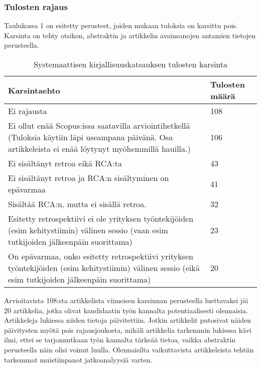 \subsubsection{Tulosten rajaus}
Taulukossa 1 on esitetty perusteet, joiden mukaan tuloksia on karsittu pois. Karsinta on tehty otsikon, abstraktin ja artikkelin avainsanojen antamien tietojen perusteella.
\begin{table}
    \begin{tabular}{|p{12cm}|p{2cm}|}
        \hline
        \textbf{Karsintaehto} & \textbf{Tulosten määrä} \\ \hline
        Ei rajausta                                                                                                                                               & 108            \\ \hline
        Ei ollut enää Scopus:issa saatavilla arviointihetkellä (Tuloksia käytiin läpi useampana päivänä. Osa artikkeleista ei enää löytynyt myöhemmillä hauilla.) & 106            \\ \hline
        Ei sisältänyt retroa eikä RCA:ta                                                                                                                          & 43             \\ \hline
        Ei sisältänyt retroa ja RCA:n sisältyminen on epävarmaa                                                                                                   & 41             \\ \hline
        Sisältää RCA:n, mutta ei sisällä retroa.                                                                                                                  & 32             \\ \hline
        Esitetty retrospektiivi ei ole yrityksen työntekijöiden (esim kehitystiimin) välinen sessio (vaan esim tutkijoiden jälkeenpäin suorittama)                & 23             \\ \hline
        On epävarmaa, onko esitetty retrospektiivi yrityksen työntekijöiden (esim kehitystiimin) välinen sessio (eikä esim tutkijoiden jälkeenpäin suorittama)    & 20             \\
        \hline
    \end{tabular}
    \caption{Systemaattisen kirjallisuuskatsauksen tulosten karsinta}
    \label{tab:karsintaehdot_taulukko}
\end{table}

Arvioitavista 108:sta artikkelista viimeisen karsinnan perusteella luettavaksi jäi 20 artikkelia, jotka olivat kandidaatin työn kannalta potentiaalisesti olennaisia. Artikkeleja lukiessa niiden tietoja päivitettiin. Jotkin artikkelit putosivat näiden päivitysten myötä pois rajausjoukosta, mikäli artikkelia tarkemmin lukiessa kävi ilmi, ettei se tarjonnutkaan työn kannalta tärkeää tietoa, vaikka abstraktin perusteella näin olisi voinut luulla. Olennaisilta vaikuttavista artikkeleista tehtiin tarkemmat muistiinpanot jatkoanalyysiä varten.

